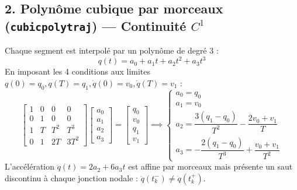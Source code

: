 \documentclass[11pt,a4paper]{report}
\begin{document}
\subsection{2. Polynôme cubique par morceaux (\texttt{cubicpolytraj}) — Continuité $C^1$}
Chaque segment est interpolé par un polynôme de degré 3 :
\begin{equation}
    q(t) = a_0 + a_1 t + a_2 t^2 + a_3 t^3
\end{equation}
En imposant les 4 conditions aux limites $q(0)=q_0, q(T)=q_1, \dot{q}(0)=v_0, \dot{q}(T)=v_1$ :
\begin{equation}
    \begin{bmatrix}
        1 & 0 & 0 & 0 \\
        0 & 1 & 0 & 0 \\
        1 & T & T^2 & T^3 \\
        0 & 1 & 2T & 3T^2
    \end{bmatrix}
    \begin{bmatrix} a_0 \\ a_1 \\ a_2 \\ a_3 \end{bmatrix} = 
    \begin{bmatrix} q_0 \\ v_0 \\ q_1 \\ v_1 \end{bmatrix}
    \implies
    \begin{cases}
        a_0 = q_0 \\
        a_1 = v_0 \\
        a_2 = \dfrac{3(q_1 - q_0)}{T^2} - \dfrac{2v_0 + v_1}{T} \\
        a_3 = -\dfrac{2(q_1 - q_0)}{T^3} + \dfrac{v_0 + v_1}{T^2}
    \end{cases}
\end{equation}
L'accélération $\ddot{q}(t) = 2a_2 + 6a_3 t$ est affine par morceaux mais présente un saut discontinu à chaque jonction nodale : $\ddot{q}(t_k^-) \neq \ddot{q}(t_k^+)$.
\end{document}
